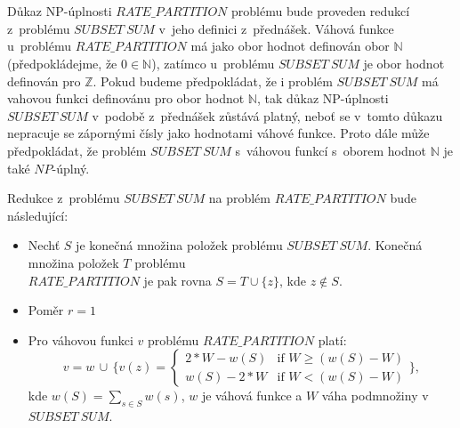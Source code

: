 \documentclass[a4paper]{article}
\newcommand{\rp}{RATE\_PARTITION}
\newcommand{\sbs}{SUBSET\ SUM}
\begin{document}
\section*{}
Důkaz NP-úplnosti $\rp$ problému bude proveden redukcí z~problému $\sbs$ v~jeho definici z~přednášek.
Váhová funkce u~problému $\rp$ má jako obor hodnot definován obor $\mathbb{N}$ (předpokládejme, že $0 \in \mathbb{N}$), zatímco u~problému
$\sbs$ je obor hodnot definován pro $\mathbb{Z}$.
Pokud budeme předpokládat, že i problém $\sbs$ má vahovou funkci definovánu pro obor hodnot $\mathbb{N}$, tak důkaz NP-úplnosti
$\sbs$ v~podobě z~přednášek zůstává platný, neboť se v~tomto důkazu nepracuje se zápornými čísly jako hodnotami váhové funkce.
Proto dále může předpokládat, že problém $\sbs$ s~váhovou funkcí s~oborem hodnot $\mathbb{N}$ je také $NP$-úplný.

Redukce z~problému $\sbs$ na problém $\rp$ bude následující:
\begin{itemize}
\item Nechť $S$ je konečná množina položek problému $\sbs$.
Konečná množina položek $T$ problému\\ $\rp$ je pak rovna $S=T \cup \{z\}$,
kde $z \not \in S$.
\item Poměr $r=1$
\item Pro váhovou funkci $v$ problému $\rp$ platí:\\
        $$v=w\, \cup\, \{
    v(z) = 
        \begin{cases}
            2*W-w(S) &\mbox{if } W \geq (w(S)-W) \\
            w(S)-2*W & \mbox{if } W < (w(S)-W) 
        \end{cases}
\},$$
kde $w(S) = \sum_{s\in S} w(s)$, $w$ je váhová funkce a $W$ váha podmnožiny v~$\sbs$.
\end{itemize}
\end{document}
